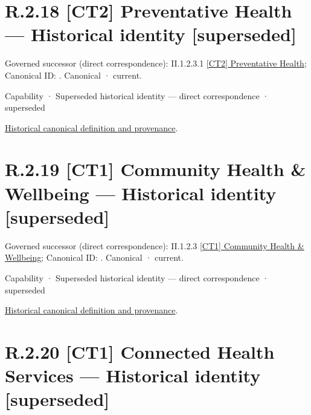 \section*{R.2.18 [CT2] Preventative Health — Historical identity [superseded]}
\label{navigation:R.2.18}

{\small Governed successor (direct correspondence): II.1.2.3.1 \hyperref[element:81be04a2d58548a4aea94f9aae90feb6]{[CT2] Preventative Health}; Canonical ID: \texttt{}. Canonical · current.}\par
\label{element:80affa7bcd284ecbbcbc5092f8497ddf}
{\small Capability · Superseded historical identity — direct correspondence · superseded}\par
\href{../../../../continuum/strategy/capability/80affa7bcd284ecbbcbc5092f8497ddf.md}{Historical canonical definition and provenance}.\par
\section*{R.2.19 [CT1] Community Health \& Wellbeing — Historical identity [superseded]}
\label{navigation:R.2.19}

{\small Governed successor (direct correspondence): II.1.2.3 \hyperref[element:b326b4aaf02a41a986ed22d184cbc152]{[CT1] Community Health \& Wellbeing}; Canonical ID: \texttt{}. Canonical · current.}\par
\label{element:175174c5cce549d2b154a4f6704721dc}
{\small Capability · Superseded historical identity — direct correspondence · superseded}\par
\href{../../../../continuum/strategy/capability/175174c5cce549d2b154a4f6704721dc.md}{Historical canonical definition and provenance}.\par
\section*{R.2.20 [CT1] Connected Health Services — Historical identity [superseded]}
\label{navigation:R.2.20}

